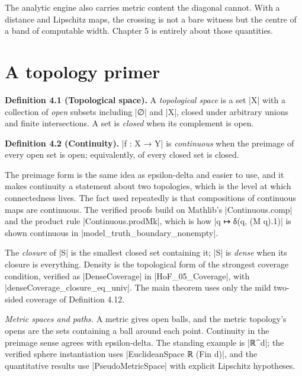 \documentclass{memoir}
\begin{document}
The analytic engine also carries metric content the diagonal cannot. With a
distance and Lipschitz maps, the crossing is not a bare witness but the centre
of a band of computable width. Chapter 5 is entirely about those quantities.



\section{A topology primer}\label{Two--Schemas--of--Impossibility-005F-005F-005F--Machine--Checked--Limits--of--Trustworthy--Machine--Learning-005F-005F-005F--and--Why--They--Tighten--with--Capability----From--Logic--to--Analysis----A--topology--primer}

\textbf{Definition 4.1 (Topological space).} A \emph{topological space} is a set \LeanVerb|X| with a
collection of \emph{open} subsets including \LeanVerb|∅| and \LeanVerb|X|, closed under arbitrary
unions and finite intersections. A set is \emph{closed} when its complement is open.

\textbf{Definition 4.2 (Continuity).} \LeanVerb|f : X → Y| is \emph{continuous} when the preimage of every
open set is open; equivalently, of every closed set is closed.

The preimage form is the same idea as epsilon-delta and easier to use, and it
makes continuity a statement about two topologies, which is the level at which
connectedness lives. The fact used repeatedly is that compositions of continuous
maps are continuous. The verified proofs build on Mathlib's \LeanVerb|Continuous.comp|
and the product rule \LeanVerb|Continuous.prodMk|, which is how \LeanVerb|q ↦ δ(q, (M q).1)| is
shown continuous in \LeanVerb|model_truth_boundary_nonempty|.

The \emph{closure} of \LeanVerb|S| is the smallest closed set containing it; \LeanVerb|S| is \emph{dense}
when its closure is everything. Density is the topological form of the strongest
coverage condition, verified as \LeanVerb|DenseCoverage| in \LeanVerb|HoF_05_Coverage|, with
\LeanVerb|denseCoverage_closure_eq_univ|. The main theorem uses only the mild two-sided
coverage of Definition 4.12.

\emph{Metric spaces and paths.} A metric gives open balls, and the metric topology's
opens are the sets containing a ball around each point. Continuity in the
preimage sense agrees with epsilon-delta. The standing example is \LeanVerb|ℝ^d|; the
verified sphere instantiation uses \LeanVerb|EuclideanSpace ℝ (Fin d)|, and the
quantitative results use \LeanVerb|PseudoMetricSpace| with explicit Lipschitz hypotheses.
\end{document}

